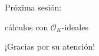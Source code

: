 \documentclass{beamer}
\renewcommand{\O}{\mathcal{O}}
\begin{document}
\begin{frame}[plain]
  \headingfont

  \begin{center}\huge
    Próxima sesión:

    cálculos con $\O_K$-ideales
  \end{center}
\end{frame}


\begin{frame}[plain]
  \headingfont

  \begin{center}
    {\huge ¡Gracias por su atención!}
  \end{center}
\end{frame}
\end{document}
